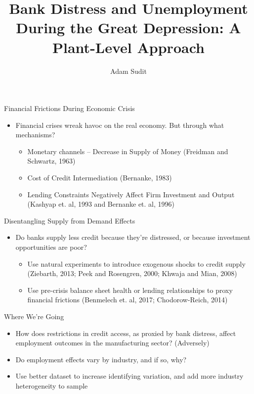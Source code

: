\documentclass[11pt]{beamer}
\author{Adam Sudit}
\title{Bank Distress and Unemployment During the Great Depression:
A Plant-Level Approach}
\institute{The University of Chicago}
\begin{document}
\begin{frame}
\titlepage
\end{frame}

\begin{frame}{Financial Frictions During Economic Crisis}

\begin{itemize}
\item Financial crises wreak havoc on the real economy. But through what mechanisms?
\begin{itemize}
\item Monetary channels -- Decrease in Supply of Money (Freidman and Schwartz, 1963)
\item Cost of Credit Intermediation (Bernanke, 1983)
\item Lending Constraints Negatively Affect Firm Investment and Output (Kashyap et. al, 1993 and Bernanke et. al, 1996)
\end{itemize}
\end{itemize}
\end{frame}

\begin{frame}{Disentangling Supply from Demand Effects}
\begin{itemize}
\item Do banks supply less credit because they're distressed, or because investment opportunities are poor?
\begin{itemize}
\item Use natural experiments to introduce exogenous shocks to credit supply (Ziebarth, 2013; Peek and Rosengren, 2000; Khwaja and Mian, 2008)
\item Use pre-crisis balance sheet health or lending relationships to proxy financial frictions (Benmelech et. al, 2017; Chodorow-Reich, 2014)
\end{itemize}
\end{itemize}
\end{frame}

\begin{frame}{Where We're Going}
\begin{itemize}
\item How does restrictions in credit access, as proxied by bank distress, affect employment outcomes in the manufacturing sector? (Adversely)
\item Do employment effects vary by industry, and if so, why?
\item Use better dataset to increase identifying variation, and add more industry heterogeneity to sample
\end{itemize}
\end{frame}
\end{document}
